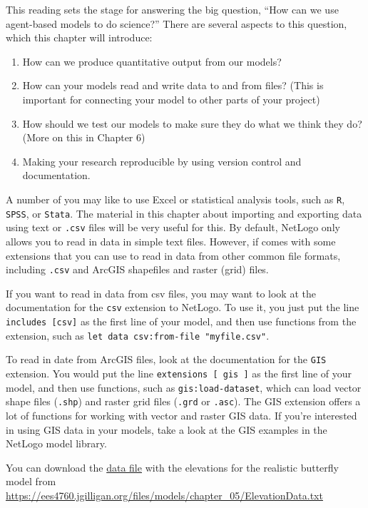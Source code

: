 \documentclass[
]{article}
\providecommand{\tightlist}{%
  \setlength{\itemsep}{0pt}\setlength{\parskip}{0pt}}
\begin{document}
This reading sets the stage for answering the big question, ``How can we
use agent-based models to do science?'' There are several aspects to
this question, which this chapter will introduce:

\begin{enumerate}
\def\labelenumi{\arabic{enumi}.}
\tightlist
\item
  How can we produce quantitative output from our models?
\item
  How can your models read and write data to and from files? (This is
  important for connecting your model to other parts of your project)
\item
  How should we test our models to make sure they do what we think they
  do? (More on this in Chapter 6)
\item
  Making your research reproducible by using version control and
  documentation.
\end{enumerate}

A number of you may like to use Excel or statistical analysis tools,
such as \texttt{R}, \texttt{SPSS}, or \texttt{Stata}. The material in
this chapter about importing and exporting data using text or
\texttt{.csv} files will be very useful for this. By default, NetLogo
only allows you to read in data in simple text files. However, if comes
with some extensions that you can use to read in data from other common
file formats, including \texttt{.csv} and ArcGIS shapefiles and raster
(grid) files.

If you want to read in data from csv files, you may want to look at the
documentation for the \texttt{csv} extension to NetLogo. To use it, you
just put the line \texttt{includes\ {[}csv{]}} as the first line of your
model, and then use functions from the extension, such as
\texttt{let\ data\ csv:from-file\ "myfile.csv"}.

To read in date from ArcGIS files, look at the documentation for the
\texttt{GIS} extension. You would put the line
\texttt{extensions\ {[}\ gis\ {]}} as the first line of your model, and
then use functions, such as \texttt{gis:load-dataset}, which can load
vector shape files (\texttt{.shp}) and raster grid files (\texttt{.grd}
or \texttt{.asc}). The GIS extension offers a lot of functions for
working with vector and raster GIS data. If you're interested in using
GIS data in your models, take a look at the GIS examples in the NetLogo
model library.

You can download the
\href{/files/models/chapter_05/ElevationData.txt}{data file} with the
elevations for the realistic butterfly model from
\url{https://ees4760.jgilligan.org/files/models/chapter_05/ElevationData.txt}
\end{document}
